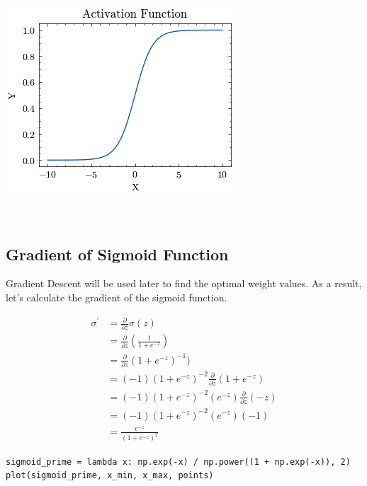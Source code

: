 \documentclass[openany]{book}
\begin{document}
    \begin{center}
    \includegraphics[width=\textwidth]{combined_files/combined_70_0.png}
    \end{center}
    { \hspace*{\fill} \\}
    
    \subsection{Gradient of Sigmoid
Function}\label{gradient-of-sigmoid-function}

Gradient Descent will be used later to find the optimal weight values.
As a result, let's calculate the gradient of the sigmoid function.

    \begin{align*}
\sigma^\prime
&= \frac{\partial}{\partial z} \sigma(z) \\
&= \frac{\partial}{\partial z} (\frac{1}{1+e^{-z}}) \\
&= \frac{\partial}{\partial z} (1+e^{-z})^{-1}) \\
&= (-1)(1+e^{-z})^{-2}\frac{\partial}{\partial z}(1+e^{-z}) \\
&= (-1)(1+e^{-z})^{-2}(e^{-z})\frac{\partial}{\partial z}(-z) \\
&= (-1)(1+e^{-z})^{-2}(e^{-z})(-1) \\
&= \frac{e^{-z}}{(1+e^{-z})^{2}}
\end{align*}

\begin{tcolorbox}
\tiny
\begin{verbatim}
sigmoid_prime = lambda x: np.exp(-x) / np.power((1 + np.exp(-x)), 2)
plot(sigmoid_prime, x_min, x_max, points)
\end{verbatim}
\end{tcolorbox}
\end{document}
